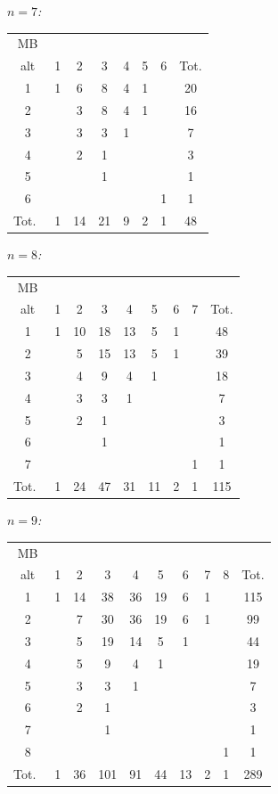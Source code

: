 \documentclass[11pt,a4paper]{article}
\begin{document}
\noindent\textit{$n=7$:}
\begin{center}
\begin{tabular}{c|cccccc|c}
MB \\ alt & 1 & 2 & 3 & 4 & 5 & 6 & Tot.\\\hline
1 & 1 & 6 & 8 & 4 & 1 & & 20\\
2 & & 3 & 8 & 4 & 1 & & 16\\
3 & & 3 & 3 & 1 & & & 7\\
4 & & 2 & 1 & & & & 3\\
5 & & & 1 & & & & 1\\
6 & & & & & & 1 & 1\\\hline
Tot.\ & 1 & 14 & 21 & 9 & 2 & 1 & 48
\end{tabular}
\end{center}

\noindent\textit{$n=8$:}
\begin{center}
\begin{tabular}{c|ccccccc|c}
MB \\ alt & 1 & 2 & 3 & 4 & 5 & 6 & 7 & Tot.\\\hline
1 & 1 & 10 & 18 & 13 & 5 & 1 & & 48\\
2 & & 5 & 15 & 13 & 5 & 1 & & 39\\
3 & & 4 & 9 & 4 & 1 & & & 18\\
4 & & 3 & 3 & 1 & & & & 7\\
5 & & 2 & 1 & & & & & 3\\
6 & & & 1 & & & & & 1\\
7 & & & & & & & 1 & 1\\\hline
Tot.\ & 1 & 24 & 47 & 31 & 11 & 2 & 1 & 115\\
\end{tabular}
\end{center}

\noindent\textit{$n=9$:}
\begin{center}
\begin{tabular}{c|cccccccc|c}
MB \\ alt & 1 & 2 & 3 & 4 & 5 & 6 & 7 & 8 & Tot.\\\hline
1 & 1 & 14 & 38 & 36 & 19 & 6 & 1 & & 115\\
2 & & 7 & 30 & 36 & 19 & 6 & 1 & & 99\\
3 & & 5 & 19 & 14 & 5 & 1 & & & 44\\
4 & & 5 & 9 & 4 & 1 & & & & 19\\
5 & & 3 & 3 & 1 & & & & & 7\\
6 & & 2 & 1 & & & & & & 3\\
7 & & & 1 & & & & & & 1\\
8 & & & & & & & & 1 & 1\\\hline
Tot.\ & 1 & 36 & 101 & 91 & 44 & 13 & 2 & 1 & 289
\end{tabular}
\end{center}
\end{document}
